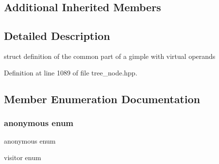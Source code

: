 \subsection*{Additional Inherited Members}


\subsection{Detailed Description}
struct definition of the common part of a gimple with virtual operands 

Definition at line 1089 of file tree\+\_\+node.\+hpp.



\subsection{Member Enumeration Documentation}
\mbox{\label{structgimple__node_a2458a46258077b83f637bb2116d387a0}} 
\subsubsection{\texorpdfstring{anonymous enum}{anonymous enum}}
{\footnotesize\ttfamily anonymous enum}



visitor enum 

